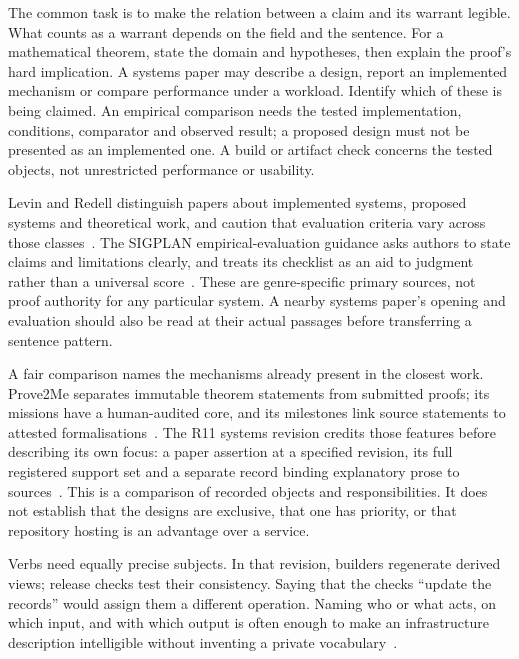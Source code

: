 The common task is to make the relation between a claim and its warrant
legible. What counts as a warrant depends on the field and the sentence.
For a mathematical theorem, state the domain and hypotheses, then explain
the proof's hard implication. A systems paper may describe a design, report an
implemented mechanism or compare performance under a workload. Identify which
of these is being claimed. An empirical comparison needs the tested
implementation, conditions, comparator and observed result; a proposed design
must not be presented as an implemented one. A build or artifact check concerns
the tested objects, not unrestricted performance or usability.

Levin and Redell distinguish papers about implemented systems, proposed
systems and theoretical work, and caution that evaluation criteria vary across
those classes~\cite{levin-redell}. The SIGPLAN empirical-evaluation guidance
asks authors to state claims and limitations clearly, and treats its checklist
as an aid to judgment rather than a universal score~\cite{sigplan-evaluation}.
These are genre-specific primary sources, not proof authority for any
particular system. A nearby systems paper's opening and evaluation should also
be read at their actual passages before transferring a sentence pattern.

A fair comparison names the mechanisms already present in the closest work.
Prove2Me separates immutable theorem statements from submitted proofs; its
missions have a human-audited core, and its milestones link source statements
to attested formalisations~\cite[\S\S3--4]{prove2me}. The R11 systems revision
credits those features before describing its own focus: a paper assertion at
a specified revision, its full registered support set and a separate record
binding explanatory prose to sources~\cite[related work]{systems}. This is a
comparison of recorded objects and responsibilities. It does not establish
that the designs are exclusive, that one has priority, or that repository
hosting is an advantage over a service.

Verbs need equally precise subjects. In that revision, builders regenerate
derived views; release checks test their consistency. Saying that the checks
``update the records'' would assign them a different operation. Naming who
or what acts, on which input, and with which output is often enough to make
an infrastructure description intelligible without inventing a private
vocabulary~\cite[stored artifacts and executable tools]{systems}.


